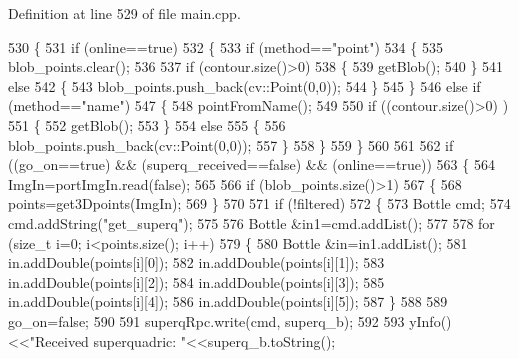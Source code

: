 Definition at line 529 of file main.\-cpp.


\begin{DoxyCode}
530     \{
531         \textcolor{keywordflow}{if} (online==\textcolor{keyword}{true})
532         \{
533             \textcolor{keywordflow}{if} (method==\textcolor{stringliteral}{"point"})
534             \{
535                 blob\_points.clear();
536 
537                 \textcolor{keywordflow}{if} (contour.size()>0)
538                 \{
539                     getBlob();
540                 \}
541                 \textcolor{keywordflow}{else}
542                 \{
543                     blob\_points.push\_back(cv::Point(0,0));
544                 \}
545             \}
546             \textcolor{keywordflow}{else} \textcolor{keywordflow}{if} (method==\textcolor{stringliteral}{"name"})
547             \{
548                 pointFromName();
549 
550                 \textcolor{keywordflow}{if} ((contour.size()>0) )
551                 \{
552                     getBlob();
553                 \}
554                 \textcolor{keywordflow}{else}
555                 \{
556                     blob\_points.push\_back(cv::Point(0,0));
557                 \}
558             \}
559         \}
560 
561         
562         \textcolor{keywordflow}{if} ((go\_on==\textcolor{keyword}{true}) && (superq\_received==\textcolor{keyword}{false}) && (online==\textcolor{keyword}{true}))
563         \{
564             ImgIn=portImgIn.read(\textcolor{keyword}{false});
565 
566             \textcolor{keywordflow}{if} (blob\_points.size()>1)
567             \{
568                 points=get3Dpoints(ImgIn);           
569             \}
570 
571             \textcolor{keywordflow}{if} (!filtered)
572             \{
573                 Bottle cmd;
574                 cmd.addString(\textcolor{stringliteral}{"get\_superq"});
575 
576                 Bottle &in1=cmd.addList();
577 
578                 \textcolor{keywordflow}{for} (\textcolor{keywordtype}{size\_t} i=0; i<points.size(); i++)
579                 \{
580                     Bottle &in=in1.addList();
581                     in.addDouble(points[i][0]);
582                     in.addDouble(points[i][1]);
583                     in.addDouble(points[i][2]);
584                     in.addDouble(points[i][3]);
585                     in.addDouble(points[i][4]);
586                     in.addDouble(points[i][5]);
587                 \}
588 
589                 go\_on=\textcolor{keyword}{false};
590 
591                 superqRpc.write(cmd, superq\_b);
592 
593                 yInfo()<<\textcolor{stringliteral}{"Received superquadric: "}<<superq\_b.toString();

\end{DoxyCode}
